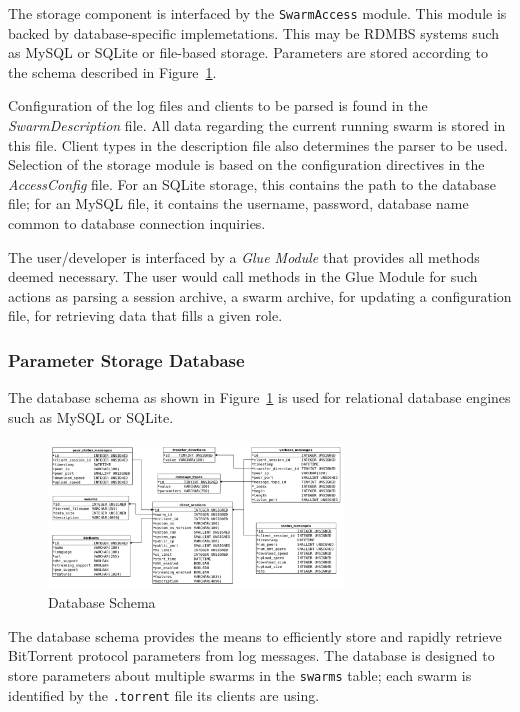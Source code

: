 The storage component is interfaced by the \texttt{SwarmAccess} module. This
module is backed by database-specific implemetations. This may be RDMBS
systems such as MySQL or SQLite or file-based storage. Parameters are stored
according to the schema described in
Figure~\ref{fig:proto-measure:database-schema}.

Configuration of the log files and clients to be parsed is found in the
\textit{SwarmDescription} file. All data regarding the current running swarm
is stored in this file. Client types in the description file also determines
the parser to be used. Selection of the storage module is based on the
configuration directives in the \textit{AccessConfig} file. For an SQLite
storage, this contains the path to the database file; for an MySQL file, it
contains the username, password, database name common to database connection
inquiries.

The user/developer is interfaced by a \textit{Glue Module} that provides all
methods deemed necessary. The user would call methods in the Glue Module for
such actions as parsing a session archive, a swarm archive, for updating a
configuration file, for retrieving data that fills a given role.

\subsubsection{Parameter Storage Database}

The database schema as shown in Figure~\ref{fig:proto-measure:database-schema}
is used for relational database engines such as MySQL or SQLite.

\begin{figure}[h]
  \begin{center}
    \includegraphics[width=0.7\textwidth]{src/img/proto-measure/database-schema}
  \end{center}
  \caption{Database Schema}
  \label{fig:proto-measure:database-schema}
\end{figure}

The database schema provides the means to efficiently store and rapidly
retrieve BitTorrent protocol parameters from log messages. The database is
designed to store parameters about multiple swarms in the \texttt{swarms}
table; each swarm is identified by the \texttt{.torrent} file its clients are
using.

